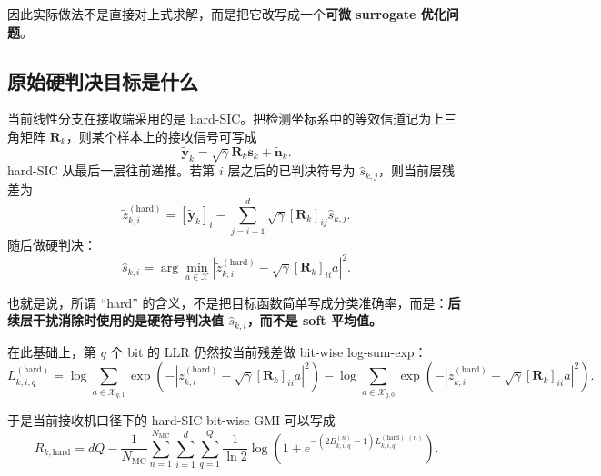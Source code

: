 \documentclass[11pt]{ctexart}
\newcommand{\Xset}{\mathcal{X}}
\begin{document}
因此实际做法不是直接对上式求解，而是把它改写成一个\textbf{可微 surrogate 优化问题}。

\subsection{原始硬判决目标是什么}
当前线性分支在接收端采用的是 hard-SIC。把检测坐标系中的等效信道记为上三角矩阵 $\bm R_k$，则某个样本上的接收信号可写成
\begin{equation}
    \widetilde{\bm y}_k
    =
    \sqrt{\gamma}\bm R_k \bm s_k
    +
    \widetilde{\bm n}_k.
\end{equation}
hard-SIC 从最后一层往前递推。若第 $i$ 层之后的已判决符号为 $\hat s_{k,j}$，则当前层残差为
\begin{equation}
    \widetilde z_{k,i}^{(\mathrm{hard})}
    =
    [\widetilde{\bm y}_k]_i
    -
    \sum_{j=i+1}^{d}
    \sqrt{\gamma}[\bm R_k]_{ij}\hat s_{k,j}.
\end{equation}
随后做硬判决：
\begin{equation}
    \hat s_{k,i}
    =
    \arg\min_{a\in\Xset}
    \left|
        \widetilde z_{k,i}^{(\mathrm{hard})}
        -
        \sqrt{\gamma}[\bm R_k]_{ii}a
    \right|^2.
\end{equation}

也就是说，所谓 ``hard'' 的含义，不是把目标函数简单写成分类准确率，而是：\textbf{后续层干扰消除时使用的是硬符号判决值 $\hat s_{k,i}$，而不是 soft 平均值。}

在此基础上，第 $q$ 个 bit 的 LLR 仍然按当前残差做 bit-wise log-sum-exp：
\begin{equation}
    L_{k,i,q}^{(\mathrm{hard})}
    =
    \log\sum_{a\in\Xset_{q,1}}
    \exp\!\left(
        -
        \left|
            \widetilde z_{k,i}^{(\mathrm{hard})}
            -
            \sqrt{\gamma}[\bm R_k]_{ii}a
        \right|^2
    \right)
    -
    \log\sum_{a\in\Xset_{q,0}}
    \exp\!\left(
        -
        \left|
            \widetilde z_{k,i}^{(\mathrm{hard})}
            -
            \sqrt{\gamma}[\bm R_k]_{ii}a
        \right|^2
    \right).
\end{equation}

于是当前接收机口径下的 hard-SIC bit-wise GMI 可以写成
\begin{equation}
    R_{k,\mathrm{hard}}
    =
    dQ
    -
    \frac{1}{N_{\mathrm{MC}}}
    \sum_{n=1}^{N_{\mathrm{MC}}}
    \sum_{i=1}^{d}
    \sum_{q=1}^{Q}
    \frac{1}{\ln 2}
    \log\!\left(
        1+
        e^{-(2B_{k,i,q}^{(n)}-1)L_{k,i,q}^{(\mathrm{hard}),(n)}}
    \right).
\end{equation}
\end{document}
